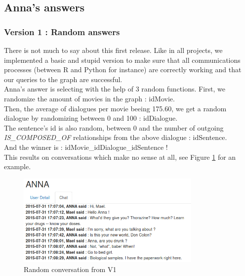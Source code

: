 %
\subsection{Anna's answers}
\label{sub:Answering}

\subsubsection{Version 1 : Random answers}
\label{sssec:v_rand}
There is not much to say about this first release. Like in all projects, we implemented a basic and stupid version to make sure that all communications processes (between R and Python for instance) are correctly working and that our queries to the graph are successful.\\
Anna's answer is selecting with the help of 3 random functions. First, we randomize the amount of movies in the graph : idMovie.\\
Then, the average of dialogues per movie beeing 175.60, we get a random dialogue by randomizing between 0 and 100 : idDialogue.\\
The sentence's id is also random, between 0 and the number of outgoing \textit{IS\_COMPOSED\_OF} relationships from the above dialogue : idSentence.\\
And the winner is : idMovie\_idDialogue\_idSentence !\\
This results on conversations which make no sense at all, see Figure \ref{fig:convRandom} for an example.\\
\begin{figure}[!h]
\begin{center}
\includegraphics[width=0.80\textwidth]{./img/convRandom.png}
\end{center}
\caption{Random conversation from V1}
\label{fig:convRandom}
\end{figure}

